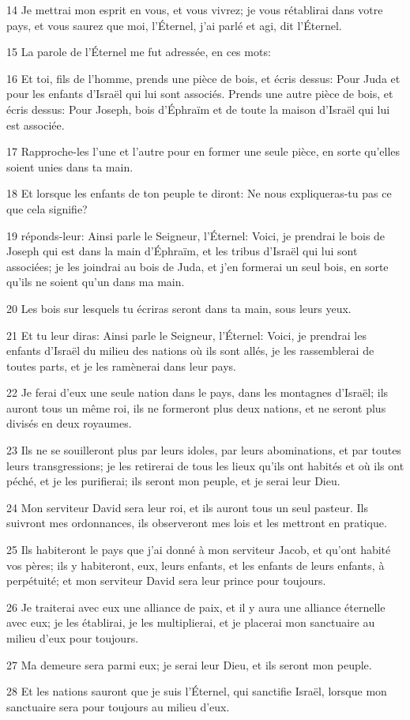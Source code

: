 \par 14 Je mettrai mon esprit en vous, et vous vivrez; je vous rétablirai dans votre pays, et vous saurez que moi, l'Éternel, j'ai parlé et agi, dit l'Éternel.
\par 15 La parole de l'Éternel me fut adressée, en ces mots:
\par 16 Et toi, fils de l'homme, prends une pièce de bois, et écris dessus: Pour Juda et pour les enfants d'Israël qui lui sont associés. Prends une autre pièce de bois, et écris dessus: Pour Joseph, bois d'Éphraïm et de toute la maison d'Israël qui lui est associée.
\par 17 Rapproche-les l'une et l'autre pour en former une seule pièce, en sorte qu'elles soient unies dans ta main.
\par 18 Et lorsque les enfants de ton peuple te diront: Ne nous expliqueras-tu pas ce que cela signifie?
\par 19 réponds-leur: Ainsi parle le Seigneur, l'Éternel: Voici, je prendrai le bois de Joseph qui est dans la main d'Éphraïm, et les tribus d'Israël qui lui sont associées; je les joindrai au bois de Juda, et j'en formerai un seul bois, en sorte qu'ils ne soient qu'un dans ma main.
\par 20 Les bois sur lesquels tu écriras seront dans ta main, sous leurs yeux.
\par 21 Et tu leur diras: Ainsi parle le Seigneur, l'Éternel: Voici, je prendrai les enfants d'Israël du milieu des nations où ils sont allés, je les rassemblerai de toutes parts, et je les ramènerai dans leur pays.
\par 22 Je ferai d'eux une seule nation dans le pays, dans les montagnes d'Israël; ils auront tous un même roi, ils ne formeront plus deux nations, et ne seront plus divisés en deux royaumes.
\par 23 Ils ne se souilleront plus par leurs idoles, par leurs abominations, et par toutes leurs transgressions; je les retirerai de tous les lieux qu'ils ont habités et où ils ont péché, et je les purifierai; ils seront mon peuple, et je serai leur Dieu.
\par 24 Mon serviteur David sera leur roi, et ils auront tous un seul pasteur. Ils suivront mes ordonnances, ils observeront mes lois et les mettront en pratique.
\par 25 Ils habiteront le pays que j'ai donné à mon serviteur Jacob, et qu'ont habité vos pères; ils y habiteront, eux, leurs enfants, et les enfants de leurs enfants, à perpétuité; et mon serviteur David sera leur prince pour toujours.
\par 26 Je traiterai avec eux une alliance de paix, et il y aura une alliance éternelle avec eux; je les établirai, je les multiplierai, et je placerai mon sanctuaire au milieu d'eux pour toujours.
\par 27 Ma demeure sera parmi eux; je serai leur Dieu, et ils seront mon peuple.
\par 28 Et les nations sauront que je suis l'Éternel, qui sanctifie Israël, lorsque mon sanctuaire sera pour toujours au milieu d'eux.

